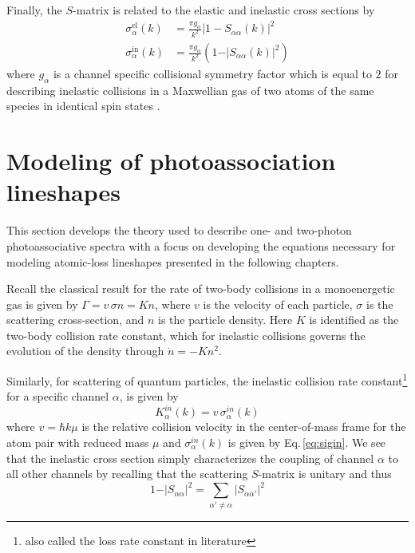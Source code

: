 Finally, the $S$-matrix is related to the elastic and inelastic cross sections by \cite{Pachomov2017}
\begingroup
\addtolength{\jot}{1em}
\begin{align}
	\sigma^{\text{el}}_{\alpha}(k) &= \frac{\pi g_{\alpha}}{k^2} \vert 1 - S_{\alpha \alpha}(k) \vert^2 \\
	\label{eq:sigin}	
	\sigma^{\text{in}}_{\alpha}(k) &= \frac{\pi g_{\alpha}}{k^2} \left( 1 - \vert S_{\alpha \alpha}(k) \vert^2 \right)
\end{align}	
\endgroup
where $g_{\alpha}$ is a channel specific collisional symmetry factor which is equal to $2$ for describing inelastic collisions in a Maxwellian gas of two atoms of the same species in identical spin states \cite{Chin2010}.


\section{Modeling of photoassociation lineshapes} \label{sec:bohn_and_julienne}
This section develops the theory used to describe one- and two-photon photoassociative spectra with a focus on developing the equations necessary for modeling atomic-loss lineshapes presented in the following chapters.

Recall the classical result for the rate of two-body collisions in a monoenergetic gas is given by $\Gamma = v \,\sigma n = K n$, where $v$ is the velocity of each particle, $\sigma$ is the scattering cross-section, and $n$ is the particle density.
Here $K$ is identified as the two-body collision rate constant, which for inelastic collisions governs the evolution of the density through $\dot{n} = -K n^2$.

Similarly, for scattering of quantum particles, the inelastic collision rate constant\footnote{also called the loss rate constant in literature} for a specific channel $\alpha$, is given by \cite{Nicholson2015a}
\begin{equation} \label{eq:simpleK}
	K^{in}_{\alpha}(k) = v\,\sigma^{in}_{\alpha}(k)
\end{equation}
where $v=\hbar k \mu$ is the relative collision velocity in the center-of-mass frame for the atom pair with reduced mass $\mu$ and $\sigma^{in}_{\alpha}(k)$ is given by Eq.\,\ref{eq:sigin}.
We see that the inelastic cross section simply characterizes the coupling of channel $\alpha$ to all other channels by recalling that the scattering $S$-matrix is unitary and thus
\begin{equation}
	1 - \vert S_{\alpha \alpha} \vert^2 = \sum_{\alpha' \neq \alpha}\vert S_{\alpha \alpha'} \vert^2
\end{equation}

